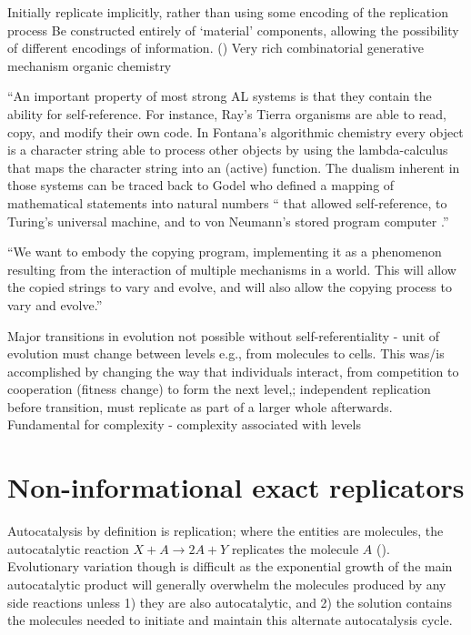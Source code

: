 \begin{NOTES}
Initially replicate implicitly, rather than using some encoding of the replication process  \parencite{Taylor2001}
Be constructed entirely of `material' components, allowing the possibility of different encodings of information. ()
Very rich combinatorial generative mechanism \eg organic chemistry \parencite{Vasas2015}

``An important property of most strong AL systems is that they contain the ability for self-reference. For instance, Ray's Tierra organisms are able to read, copy, and modify their own code. In Fontana's algorithmic chemistry every object is a character string able to process other objects by using the lambda-calculus that maps the character string into an (active) function. The dualism inherent in those systems can be traced back to Godel who defined a mapping of mathematical statements into natural numbers `` that allowed self-reference, to Turing's universal machine, and to von Neumann's stored program computer .''\parencite{Dittrich1998}

``We want to embody the copying program, implementing it as a phenomenon resulting from the interaction of multiple mechanisms in a world. This will allow the copied strings to vary and evolve, and will also allow the copying process to vary and evolve.'' \cite{Nellis2014}

Major transitions in evolution not possible without self-referentiality - unit of evolution must change between levels e.g., from molecules to cells. This was/is accomplished by changing the way that individuals interact, from competition to cooperation (fitness change) to form the next level,; independent replication before transition, must replicate as part of a larger whole afterwards. 
Fundamental for complexity - complexity associated with levels  \parencite{Watson2015}
\end{NOTES}

\section{Non-informational exact replicators}

Autocatalysis by definition is replication; where the entities are molecules, the autocatalytic reaction $X + A\rightarrow 2A + Y$ replicates the molecule $A$ (\eg \cite{Zachar2010,Lifson1997}). Evolutionary variation though is difficult as the exponential growth of the main autocatalytic product will generally overwhelm the molecules produced by any side reactions unless 1) they are also autocatalytic, and 2) the solution contains the molecules needed to initiate and maintain this alternate autocatalysis cycle.

